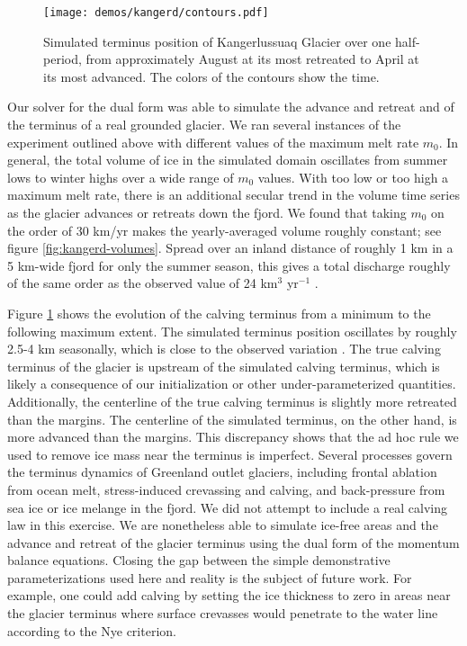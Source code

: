 \documentclass[review,oneside]{igs}
\begin{document}
\begin{figure}[h]
    \begin{center}
        \texttt{[image: demos/kangerd/contours.pdf]}
    \end{center}
    \caption{Simulated terminus position of Kangerlussuaq Glacier over one half-period, from approximately August at its most retreated to April at its most advanced.
    The colors of the contours show the time.}
    \label{fig:kangerd-contours}
\end{figure}

Our solver for the dual form was able to simulate the advance and retreat and of the terminus of a real grounded glacier.
We ran several instances of the experiment outlined above with different values of the maximum melt rate $m_0$.
In general, the total volume of ice in the simulated domain oscillates from summer lows to winter highs over a wide range of $m_0$ values.
With too low or too high a maximum melt rate, there is an additional secular trend in the volume time series as the glacier advances or retreats down the fjord.
We found that taking $m_0$ on the order of 30 km/yr makes the yearly-averaged volume roughly constant; see figure \ref{fig:kangerd-volumes}.
Spread over an inland distance of roughly 1 km in a 5 km-wide fjord for only the summer season, this gives a total discharge roughly of the same order as the observed value of 24 km${}^3$ yr${}^{-1}$ \citep{king2018seasonal}.

Figure \ref{fig:kangerd-contours} shows the evolution of the calving terminus from a minimum to the following maximum extent.
The simulated terminus position oscillates by roughly 2.5-4 km seasonally, which is close to the observed variation \citep{schild2013seasonal}.
The true calving terminus of the glacier is upstream of the simulated calving terminus, which is likely a consequence of our initialization or other under-parameterized quantities.
Additionally, the centerline of the true calving terminus is slightly more retreated than the margins.
The centerline of the simulated terminus, on the other hand, is more advanced than the margins.
This discrepancy shows that the ad hoc rule we used to remove ice mass near the terminus is imperfect.
Several processes govern the terminus dynamics of Greenland outlet glaciers, including frontal ablation from ocean melt, stress-induced crevassing and calving, and back-pressure from sea ice or ice melange in the fjord.
We did not attempt to include a real calving law in this exercise.
We are nonetheless able to simulate ice-free areas and the advance and retreat of the glacier terminus using the dual form of the momentum balance equations.
Closing the gap between the simple demonstrative parameterizations used here and reality is the subject of future work.
For example, one could add calving by setting the ice thickness to zero in areas near the glacier terminus where surface crevasses would penetrate to the water line according to the Nye criterion.
\end{document}
